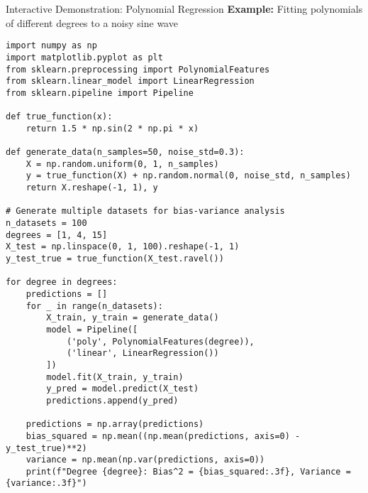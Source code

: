 \documentclass[aspectratio=169,11pt]{beamer}
\begin{document}
\begin{frame}[fragile]{Interactive Demonstration: Polynomial Regression}
\textbf{Example:} Fitting polynomials of different degrees to a noisy sine wave

\begin{lstlisting}[basicstyle=\ttfamily\tiny]
import numpy as np
import matplotlib.pyplot as plt
from sklearn.preprocessing import PolynomialFeatures
from sklearn.linear_model import LinearRegression
from sklearn.pipeline import Pipeline

def true_function(x):
    return 1.5 * np.sin(2 * np.pi * x)

def generate_data(n_samples=50, noise_std=0.3):
    X = np.random.uniform(0, 1, n_samples)
    y = true_function(X) + np.random.normal(0, noise_std, n_samples)
    return X.reshape(-1, 1), y

# Generate multiple datasets for bias-variance analysis
n_datasets = 100
degrees = [1, 4, 15]
X_test = np.linspace(0, 1, 100).reshape(-1, 1)
y_test_true = true_function(X_test.ravel())

for degree in degrees:
    predictions = []
    for _ in range(n_datasets):
        X_train, y_train = generate_data()
        model = Pipeline([
            ('poly', PolynomialFeatures(degree)),
            ('linear', LinearRegression())
        ])
        model.fit(X_train, y_train)
        y_pred = model.predict(X_test)
        predictions.append(y_pred)
    
    predictions = np.array(predictions)
    bias_squared = np.mean((np.mean(predictions, axis=0) - y_test_true)**2)
    variance = np.mean(np.var(predictions, axis=0))
    print(f"Degree {degree}: Bias^2 = {bias_squared:.3f}, Variance = {variance:.3f}")
\end{lstlisting}
\end{frame}
\end{document}
